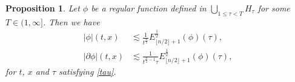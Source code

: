 \documentclass{article}
\newtheorem{proposition}{Proposition}[section]
\begin{document}


%
\begin{proposition} \label{prop KSphi}
Let $ \phi $ be a regular function defined in $ \bigcup_{ 1 \leq \tau < T } H_\tau $ for some $ T \in ( 1 , \infty ] $. Then we have
\begin{align}
| \phi | ( t , x ) & \lesssim \frac{ 1 }{ t^\frac{ n }{ 2 } } E_{ \lfloor n / 2 \rfloor +1 }^{ \frac12 } ( \phi ) ( \tau ) , \label{KSphi} \\
| \partial \phi | ( t , x ) & \lesssim \frac{ 1 }{ t^{ \frac{ n }{ 2 } - 1 } \tau } E_{ \lfloor n / 2 \rfloor +1 }^{ \frac12 } ( \phi ) ( \tau ) , \label{KSphiimprove}
\end{align}
for $ t $, $ x $ and $ \tau $ satisfying \eqref{tau}.
\end{proposition}
\end{document}
